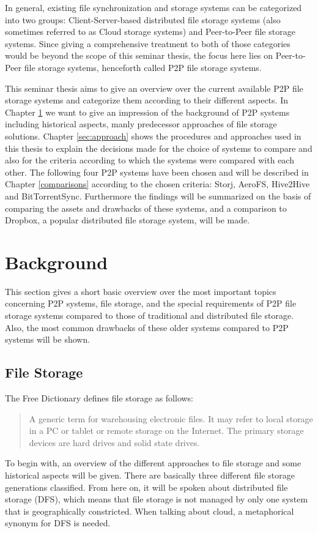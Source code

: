 In general, existing file synchronization and storage systems can be categorized into two groups: Client-Server-based distributed file storage systems (also sometimes referred to as Cloud storage systems) and Peer-to-Peer file storage systems. Since giving a comprehensive treatment to both of those categories would be beyond the scope of this seminar thesis, the focus here lies on Peer-to-Peer file storage systems, henceforth called P2P file storage systems.

This seminar thesis aims to give an overview over the current available P2P file storage systems and categorize them according to their different aspects. In Chapter \ref{sec:background} we want to give an impression of the background of P2P systems including historical aspects, manly predecessor approaches of file storage solutions. Chapter \ref{sec:approach} shows the procedures and approaches used in this thesis to explain the decisions made for the choice of systems to compare and also for the criteria according to which the systems were compared with each other. The following four P2P systems have been chosen and will be described in Chapter \ref{comparisons} according to the chosen criteria: Storj, AeroFS, Hive2Hive and BitTorrentSync. Furthermore the findings will be summarized on the basis of comparing the assets and drawbacks of these systems, and a comparison to Dropbox, a popular distributed file storage system, will be made.

\section{Background}
\label{sec:background}
This section gives a short basic overview over the most important topics concerning P2P systems, file storage, and the special requirements of P2P file storage systems compared to those of traditional and distributed file storage. Also, the most common drawbacks of these older systems compared to P2P systems will be shown.

\subsection{File Storage}
The Free Dictionary defines file storage as follows:
\begin{quote}
A generic term for warehousing electronic files. It may refer to local storage in a PC or tablet or remote storage on the Internet. The primary storage devices are hard drives and solid state drives. \cite{thefreedictionary}
\end{quote}
To begin with, an overview of the different approaches to file storage and some historical aspects will be given. There are basically three different file storage generations classified. From here on, it will be spoken about distributed file storage (DFS), which means that file storage is not managed by only one system that is geographically constricted. When talking about cloud, a metaphorical synonym for DFS is needed.

